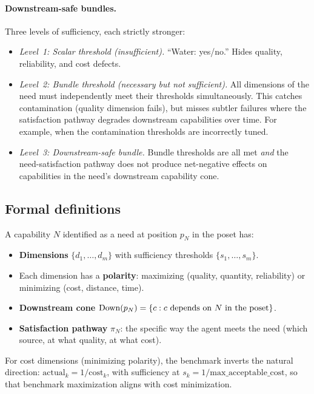 \paragraph{Downstream-safe bundles.}
Three levels of sufficiency, each strictly stronger:
\begin{itemize}
\item \emph{Level~1: Scalar threshold (insufficient).}
  ``Water: yes/no.''  Hides quality, reliability, and cost defects.
\item \emph{Level~2: Bundle threshold (necessary but not
  sufficient).}
  All dimensions of the need must independently meet their thresholds
        simultaneously. This catches contamination (quality dimension fails),
        but misses subtler failures where the satisfaction pathway degrades
        downstream capabilities over time. For example, when the contamination
        thresholds are incorrectly tuned.
\item \emph{Level~3: Downstream-safe bundle.}
  Bundle thresholds are all met \emph{and} the need-satisfaction pathway does
        not produce net-negative effects on capabilities in the need's
        downstream capability cone.
\end{itemize}

\subsection{Formal definitions}

\begin{definition}
\label{def:need_bundle}
A capability $N$ identified as a need at position $p_N$ in the
poset has:
\begin{itemize}
\item \textbf{Dimensions} $\{d_1, \ldots, d_m\}$ with sufficiency
  thresholds $\{s_1, \ldots, s_m\}$.
\item Each dimension has a \textbf{polarity}: maximizing (quality,
  quantity, reliability) or minimizing (cost, distance, time).
\item \textbf{Downstream cone}
  $\mathrm{Down}(p_N) = \{c : c \text{ depends on } N \text{ in the
  poset}\}$.
\item \textbf{Satisfaction pathway} $\pi_N$: the specific way the
  agent meets the need (which source, at what quality, at what
  cost).
\end{itemize}
For cost dimensions (minimizing polarity), the benchmark inverts
the natural direction: $\mathrm{actual}_k = 1 / \mathrm{cost}_k$,
with sufficiency at $s_k = 1 / \mathrm{max\_acceptable\_cost}$,
so that benchmark maximization aligns with cost minimization.
\end{definition}

